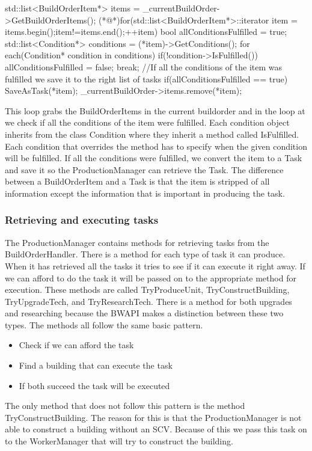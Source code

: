 				\begin{Sourcecode}[caption=BuildOrderHandler main loop]
		std::list<BuildOrderItem*> items = _currentBuildOrder->GetBuildOrderItems();
		(*@\lnote@*)for(std::list<BuildOrderItem*>::iterator item = items.begin();item!=items.end();++item)
		{
			bool allConditionsFulfilled = true;
			std::list<Condition*> conditions = (*item)->GetConditions();
			for each(Condition* condition in conditions)
			{
				if(!condition->IsFulfilled())
				{
					allConditionsFulfilled = false;
					break;
				}
			}
			//If all the conditions of the item was fulfilled we save it to the right list of tasks
			if(allConditionsFulfilled == true)
			{
				SaveAsTask(*item);				
				_currentBuildOrder->items.remove(*item);
			}
		}	
				\end{Sourcecode}
			This loop grabs the BuildOrderItems in the current buildorder and in the loop at  we check if all the conditions of the item were 
			fulfilled. Each condition object inherits from the class Condition where they inherit a method called IsFulfilled. Each condition that 
			overrides the method has to specify when the given condition will be fulfilled. If all the conditions were fulfilled, we convert the 
			item to a Task and save it so the ProductionManager can retrieve the Task. The difference between a BuildOrderItem and a Task is that the 
			item is stripped of all information except the information that is important in producing the task. 
			
		\subsubsection*{Retrieving and executing tasks}
			The ProductionManager contains methods for retrieving tasks from the BuildOrderHandler. There is a method for each type of task it can 
			produce. When it has retrieved all the tasks it tries to see if it can execute it right away. 
			If we can afford to do the task it will be passed on to the appropriate method for execution. These 
			methods are called TryProduceUnit, TryConstructBuilding, TryUpgradeTech, and TryResearchTech. There is a method for both upgrades and 
			researching because the BWAPI makes a distinction between these two types. The methods all follow the same basic 
			pattern.
			\begin{itemize}
				\item Check if we can afford the task
				\item Find a building that can execute the task
				\item If both succeed the task will be executed
			\end{itemize}
			The only method that does not follow this pattern is the method TryConstructBuilding. The reason for this is that the ProductionManager is not 
			able to construct a building without an SCV. Because of this we pass this task on to the WorkerManager that will try to construct the building.
			
